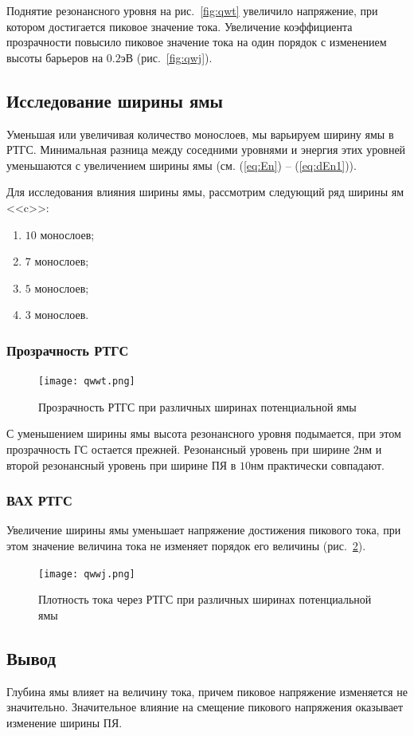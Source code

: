 Поднятие резонансного уровня на рис.~\ref{fig:qwt} увеличило напряжение, при котором достигается пиковое значение тока. Увеличение коэффициента прозрачности повысило пиковое значение тока на один порядок с изменением высоты барьеров на $0.2$эВ (рис.~\ref{fig:qwj}).

\subsection{Исследование ширины ямы}
Уменьшая или увеличивая количество монослоев, мы варьируем ширину ямы в РТГС. Минимальная разница между соседними уровнями и энергия этих уровней уменьшаются с увеличением ширины ямы (см. (\ref{eq:En}) -- (\ref{eq:dEn1})).

Для исследования влияния ширины ямы, рассмотрим следующий ряд ширины ям <<c>>:
\begin{enumerate}
	\item $10$ монослоев;
	\item $7$ монослоев;
	\item $5$ монослоев;
	\item $3$ монослоев.
\end{enumerate}

\subsubsection{Прозрачность РТГС}
\begin{figure}[h!]
	\centering
	\texttt{[image: qwwt.png]}
	\caption{Прозрачность РТГС при различных ширинах потенциальной ямы}
	\label{fig:qwwt}
\end{figure}

С уменьшением ширины ямы высота резонансного уровня подымается, при этом прозрачность ГС остается прежней. Резонансный уровень при ширине $2$нм и второй резонансный уровень при ширине ПЯ в $10$нм практически совпадают. 
\subsubsection{ВАХ РТГС}
Увеличение ширины ямы уменьшает напряжение достижения пикового тока, при этом значение величина тока не изменяет порядок его величины (рис.~\ref{fig:qwwj}).

\begin{figure}[h!]
	\centering
	\texttt{[image: qwwj.png]}
	\caption{Плотность тока через РТГС при различных ширинах потенциальной ямы}
	\label{fig:qwwj}
\end{figure}

\subsection{Вывод}

Глубина ямы влияет на величину тока, причем пиковое напряжение изменяется не значительно. Значительное влияние на смещение пикового напряжения оказывает изменение ширины ПЯ.